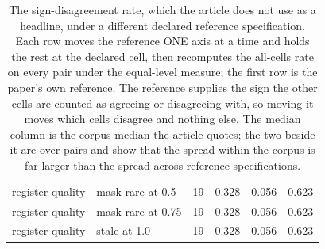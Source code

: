 \begin{table}[t]
{\begin{tabular}{lllrrr}
register quality & mask rare at 0.5 & 19 & 0.328 & 0.056 & 0.623 \\
register quality & mask rare at 0.75 & 19 & 0.328 & 0.056 & 0.623 \\
register quality & stale at 1.0 & 19 & 0.328 & 0.056 & 0.623 \\
\bottomrule
\end{tabular}%
}
\caption{The sign-disagreement rate, which the article does not use as a headline, under a different declared reference specification. Each row moves the reference ONE axis at a time and holds the rest at the declared cell, then recomputes the all-cells rate on every pair under the equal-level measure; the first row is the paper's own reference. The reference supplies the sign the other cells are counted as agreeing or disagreeing with, so moving it moves which cells disagree and nothing else. The median column is the corpus median the article quotes; the two beside it are over pairs and show that the spread within the corpus is far larger than the spread across reference specifications.}
\label{tab:refsens}
\end{table}

